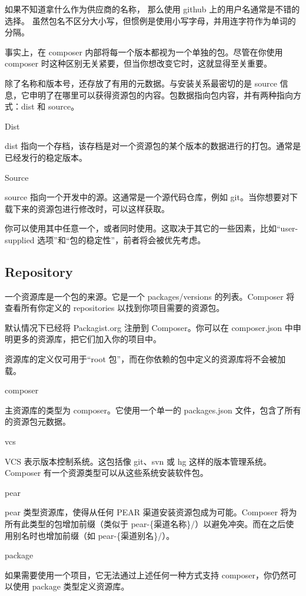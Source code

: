 如果不知道拿什么作为供应商的名称， 那么使用 github 上的用户名通常是不错的选择。 虽然包名不区分大小写，但惯例是使用小写字母，并用连字符作为单词的分隔。

事实上，在 composer 内部将每一个版本都视为一个单独的包。尽管在你使用 composer 时这种区别无关紧要，但当你想改变它时，这就显得至关重要。

除了名称和版本号，还存放了有用的元数据。与安装关系最密切的是 source 信息，它申明了在哪里可以获得资源包的内容。包数据指向包内容，并有两种指向方式：dist 和 source。

\begin{compactitem}
\item Dist

dist 指向一个存档，该存档是对一个资源包的某个版本的数据进行的打包。通常是已经发行的稳定版本。

\item Source

source 指向一个开发中的源。这通常是一个源代码仓库，例如 git。当你想要对下载下来的资源包进行修改时，可以这样获取。
\end{compactitem}

你可以使用其中任意一个，或者同时使用。这取决于其它的一些因素，比如“user-supplied 选项”和“包的稳定性”，前者将会被优先考虑。

\subsection{Repository}

一个资源库是一个包的来源。它是一个 packages/versions 的列表。Composer 将查看所有你定义的 repositories 以找到你项目需要的资源包。

默认情况下已经将 Packagist.org 注册到 Composer。你可以在 composer.json 中申明更多的资源库，把它们加入你的项目中。

资源库的定义仅可用于“root 包”，而在你依赖的包中定义的资源库将不会被加载。

\begin{compactitem}
\item composer

主资源库的类型为 composer。它使用一个单一的 packages.json 文件，包含了所有的资源包元数据。

\item vcs

VCS 表示版本控制系统。这包括像 git、svn 或 hg 这样的版本管理系统。Composer 有一个资源类型可以从这些系统安装软件包。

\item pear

pear 类型资源库，使得从任何 PEAR 渠道安装资源包成为可能。Composer 将为所有此类型的包增加前缀（类似于 pear-\{渠道名称\}/）以避免冲突。而在之后使用别名时也增加前缀（如 pear-\{渠道别名\}/）。

\item package

如果需要使用一个项目，它无法通过上述任何一种方式支持 composer，你仍然可以使用 package 类型定义资源库。

\end{compactitem}

